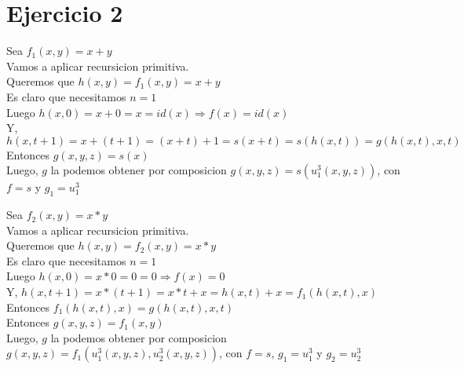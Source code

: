 \documentclass[]{article}
\title{}
\author{}
\begin{document}
\maketitle

\begin{abstract}

\end{abstract}

\section{Ejercicio 2}

\begin{flushleft}
Sea $f_{1}(x,y) = x + y$\linebreak
\\Vamos a aplicar recursicion primitiva. 
\\Queremos que $h(x,y) = f_{1}(x,y) = x + y$
\\Es claro que necesitamos $n=1$
\\Luego $h(x,0) = x + 0 = x = id(x) \Rightarrow f(x) = id(x)$
\\Y, $h(x,t+1) = x+(t+1) = (x+t)+1 = s(x+t) = s(h(x,t)) = g(h(x,t),x,t)$
\\Entonces $g(x,y,z) = s(x)$
\\Luego, $g$ la podemos obtener por composicion $g(x,y,z)=s(u^{3}_{1}(x,y,z))$, con $f = s$ y $g_{1} = u^{3}_{1}$

\end{flushleft}

\begin{flushleft}
	Sea $f_{2}(x,y) = x * y$\linebreak
	\\Vamos a aplicar recursicion primitiva. 
	\\Queremos que $h(x,y) = f_{2}(x,y) = x * y$
	\\Es claro que necesitamos $n=1$
	\\Luego $h(x,0) = x * 0 = 0 = 0 \Rightarrow f(x) = 0$
	\\Y, $h(x,t+1) = x*(t+1) = x*t + x = h(x,t) + x = f_{1}(h(x,t),x)$
	\\Entonces 	$f_{1}(h(x,t),x) = g(h(x,t),x,t)$
	\\Entonces $g(x,y,z) = f_{1}(x,y)$
	\\Luego, $g$ la podemos obtener por composicion $g(x,y,z)=f_{1}(u^{3}_{1}(x,y,z),u^{3}_{2}(x,y,z))$, con $f = s$, $g_{1} = u^{3}_{1}$ y $g_{2} = u^{3}_{2}$
	
\end{flushleft}
\end{document}
